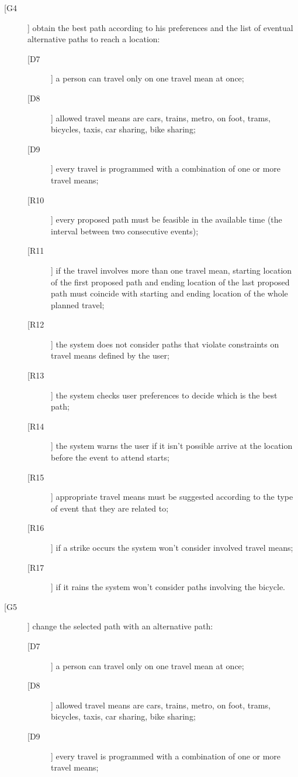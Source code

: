 \begin{description}
\begin{description}
	\end{description}
\item[[G4]] obtain the best path according to his preferences and the list of eventual alternative paths to reach a location:
	\begin{description}
	\item[[D7]] a person can travel only on one travel mean at once; 
	\item[[D8]] allowed travel means are cars, trains, metro, on foot, trams, bicycles, taxis, car sharing, bike sharing;
	\item[[D9]] every travel is programmed with a combination of one or more travel means;
	\newline
	\item[[R10]] every proposed path must be feasible in the available time (the interval between two consecutive events);
	\item[[R11]] if the travel involves more than one travel mean, starting location of the first proposed path and ending location of the last proposed path must coincide with starting and ending location of the whole planned travel;
	\item[[R12]] the system does not consider paths that violate constraints on travel means defined by the user;
	\item[[R13]] the system checks user preferences to decide which is the best path;
	\item[[R14]] the system warns the user if it isn’t possible arrive at the location before the event to attend starts;
	\item[[R15]] appropriate travel means must be suggested according to the type of event that they are related to; 
	\item[[R16]] if a strike occurs the system won’t consider involved travel means;
	\item[[R17]] if it rains the system won’t consider paths involving the bicycle.
	\end{description}
\item[[G5]] change the selected path with an alternative path:
	\begin{description}
	\item[[D7]] a person can travel only on one travel mean at once; 
	\item[[D8]] allowed travel means are cars, trains, metro, on foot, trams, bicycles, taxis, car sharing, bike sharing;
	\item[[D9]] every travel is programmed with a combination of one or more travel means;

\end{description}
\end{description}
